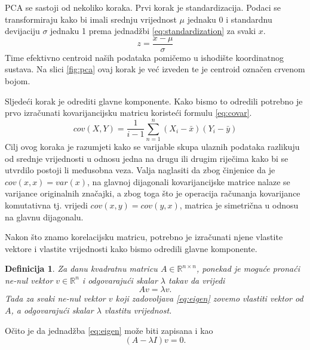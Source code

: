 \documentclass[times, utf8, diplomski]{fer}
\newtheorem{definition}{Definicija}         %
\begin{document}
PCA se sastoji od nekoliko koraka.
Prvi korak je standardizacija. Podaci se transformiraju kako bi imali srednju vrijednost $\mu$ jednaku 0 i standardnu devijaciju $\sigma$ jednaku 1 prema jednadžbi \ref{eq:standardization} za svaki \(x\).
\begin{equation}
    z = \frac{x - \mu}{\sigma}
    \label{eq:standardization}
\end{equation}
Time efektivno centroid naših podataka pomičemo u ishodište koordinatnog sustava. Na slici \ref{fig:pca} ovaj korak je već izveden te je centroid označen crvenom bojom.

Sljedeći korak je odrediti glavne komponente. Kako bismo to odredili potrebno je prvo izračunati kovarijancijsku matricu koristeći formulu \ref{eq:covar}.
\begin{equation}
    cov(X, Y) = \frac{1}{i - 1}\sum_{n=1}^{n} (X_i - \bar{x})(Y_i - \bar{y})
    \label{eq:covar}
\end{equation}
Cilj ovog koraka je razumjeti kako se varijable skupa ulaznih podataka razlikuju od srednje vrijednosti u odnosu jedna na drugu ili drugim riječima kako bi se utvrdilo postoji li međusobna veza. Valja naglasiti da zbog činjenice da je $cov(x, x) = var(x)$, na glavnoj dijagonali kovarijancijske matrice nalaze se varijance originalnih značajki, a zbog toga što je operacija računanja kovarijance komutativna tj. vrijedi $cov(x,y) = cov(y, x)$, matrica je simetrična u odnosu na glavnu dijagonalu.

Nakon što znamo korelacijsku matricu, potrebno je izračunati njene vlastite vektore  i vlastite vrijednosti  kako bismo odredili glavne komponente.

\begin{definition}
    Za danu kvadratnu matricu $A \in \mathbb{R}^{n \times n}$, ponekad je moguće pronaći ne-nul vektor $v \in \mathbb{R}^n$ i odgovarajući skalar $\lambda$ takav da vrijedi
    \begin{equation}
        Av = \lambda v.
        \label{eq:eigen}
    \end{equation}
    Tada za svaki ne-nul vektor $v$ koji zadovoljava \ref{eq:eigen} zovemo vlastiti vektor od $A$, a odgovarajući skalar $\lambda$ vlastitu vrijednost.
\end{definition}
Očito je da jednadžba \ref{eq:eigen} može biti zapisana i kao
\begin{equation}
    (A - \lambda I)v = 0.
\end{equation}
\end{document}
